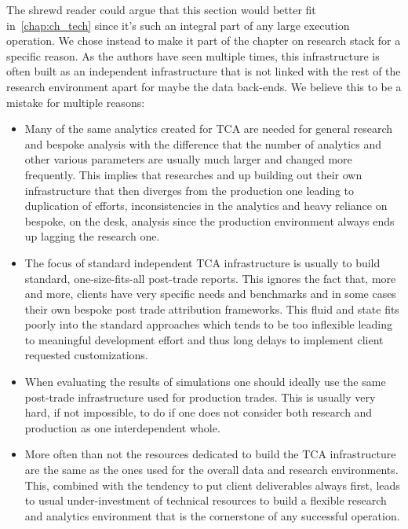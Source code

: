 The shrewd reader could argue that this section would better fit in~\ref{chap:ch_tech} since it's such an integral part of any large execution operation. We chose instead to make it part of the chapter on research stack for a specific reason. As the authors have seen multiple times, this infrastructure is often built as an independent infrastructure that is not linked with the rest of the research environment apart for maybe the data back-ends. We believe this to be a mistake for multiple reasons:
\begin{itemize}
\item Many of the same analytics created for TCA are needed for general research and bespoke analysis with the difference that the number of analytics and other various parameters are usually much larger and changed more frequently. This implies that researches and up building out their own infrastructure that then diverges from the production one leading to duplication of efforts, inconsistencies in the analytics and heavy reliance on bespoke, on the desk, analysis since the production environment always ends up lagging the research one.
\item The focus of standard independent TCA infrastructure is usually to build standard, one-size-fits-all post-trade reports. This ignores the fact that, more and more, clients have very specific needs and benchmarks and in some cases their own bespoke post trade attribution frameworks.  This fluid and state fits poorly into the standard approaches which tends to be too inflexible leading to meaningful development effort and thus long delays to implement client requested customizations.
\item When evaluating the results of simulations one should ideally use the same post-trade infrastructure used for production trades. This is usually very hard, if not impossible, to do if one does not consider both research and production as one interdependent whole.
\item More often than not the resources dedicated to build the TCA infrastructure are the same as the ones used for the overall data and research environments. This, combined with the tendency to put client deliverables always first, leads to usual under-investment of technical resources to build a flexible research and analytics environment that is the cornerstone of any successful operation.
\end{itemize}

